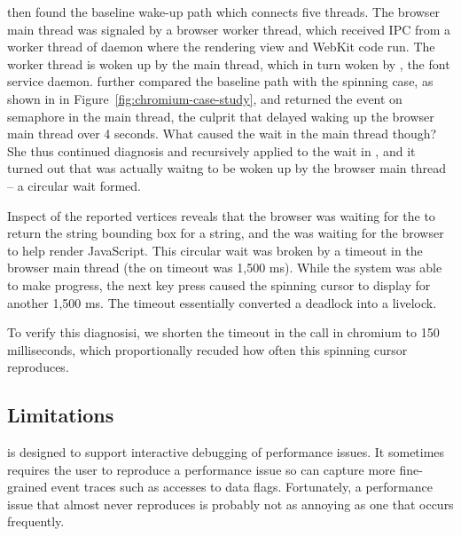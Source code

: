 \xxx then found the baseline wake-up path which connects five threads.
The browser main thread was signaled by a browser worker thread, which
received IPC from a worker thread of daemon  where the rendering view
and WebKit code run. The worker thread is woken up by the  main
thread, which in turn woken by , the font service daemon. \xxx further
compared the baseline path with the spinning case, as shown in 
in Figure~\ref{fig:chromium-case-study}, and returned the  event
on semaphore in the  main thread, the culprit that delayed
waking up the browser main thread over 4 seconds. What caused the wait in the
 main thread though? She thus continued diagnosis and recursively
applied \xxx to the wait in , and it turned out that  was
actually waitng to be woken up by the browser main thread -- a circular wait formed.


Inspect of the reported vertices reveals that the browser was waiting for 
the  to return the string bounding box for a string, and
the  was waiting for the browser to help render JavaScript. This
circular wait was broken by a timeout in the browser main thread (the 
on  timeout was 1,500 ms). While the system was able to make progress, the
next key press caused the spinning cursor to display for another 1,500 ms. The
timeout essentially converted a deadlock into a livelock.

To verify this diagnosisi, we shorten the
timeout in the  call in chromium
to 150 milliseconds, which proportionally recuded how often this 
spinning cursor reproduces.

\subsection{Limitations}

\xxx is designed to support interactive debugging of performance issues. It
sometimes requires the user to reproduce a performance issue so \xxx can capture
more fine-grained event traces such as accesses to data flags. Fortunately, a
performance issue that almost never reproduces is probably not as annoying as
one that occurs frequently.

